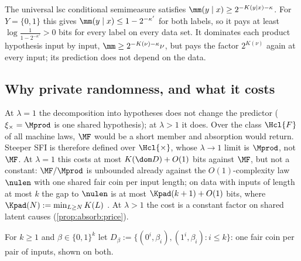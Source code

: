 \begin{remark}\label{rem:absorb:condsemi}
The universal lsc conditional semimeasure satisfies $\mm(y\mid x)\ge2^{-K(y\mid x)-\kappa}$. For $Y=\{0,1\}$ this gives $\mm(y\mid x)\le1-2^{-\kappa'}$ for both labels, so it pays at least $\log\frac1{1-2^{-\kappa'}}>0$ bits for every label on every data set. It dominates each product hypothesis input by input, $\mm\ge2^{-K(\nu)-\kappa}\nu$, but pays the factor $2^{K(\nu)}$ again at every input; its prediction does not depend on the data.
\end{remark}

\subsection{Why private randomness, and what it costs}\label{sec:absorb:price}

\begin{remark}\label{rem:absorb:why}
At $\lambda=1$ the decomposition into hypotheses does not change the predictor ($\xi_\times=\Mprod$ is one shared hypothesis); at $\lambda>1$ it does. Over the class $\Hcl{F}$ of all machine laws, $\MF$ would be a short member and absorption would return. Steeper SFI is therefore defined over $\Hcl{\times}$, whose $\lambda\to1$ limit is $\Mprod$, not $\MF$. At $\lambda=1$ this costs at most $K(\dom D)+O(1)$ bits against $\MF$, but not a constant: $\MF/\Mprod$ is unbounded already against the $O(1)$-complexity law $\nulen$ with one shared fair coin per input length; on data with inputs of length at most $k$ the gap to $\nulen$ is at most $\Kpad(k+1)+O(1)$ bits, where $\Kpad(N):=\min_{L\ge N}K(L)$ \citep[the chain theorem, the shared-coin proposition and the remark after it]{claudeSFI2026fundamentals}. At $\lambda>1$ the cost is a constant factor on shared latent causes (\cref{prop:absorb:price}).
\end{remark}

For $k\ge1$ and $\beta\in\{0,1\}^k$ let $D_\beta:=\{(0^i,\beta_i),(1^i,\beta_i):i\le k\}$: one fair coin per pair of inputs, shown on both.

